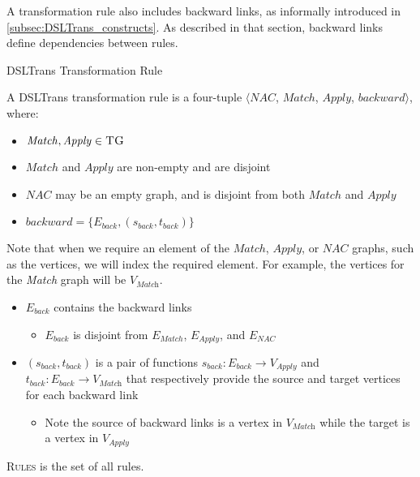 A transformation rule also includes backward links, as informally introduced in \cref{subsec:DSLTrans_constructs}. As described in that section, backward links define dependencies between rules. 


\begin{definition}{DSLTrans Transformation Rule\\}
\label{def:transformation_rule}

A DSLTrans transformation rule is a four-tuple $\big\langle \mathit{NAC}$, $\mathit{Match}$, $\mathit{Apply}$, $\mathit{backward}\big\rangle$, where:

\begin{itemize}
\item $\mathit{Match}, \mathit{Apply} \in \textsc{TG}$
\item $\mathit{Match}$ and $\mathit{Apply} $ are non-empty and are disjoint
\item $\mathit{NAC}$ may be an empty graph, and is disjoint from both $\mathit{Match}$ and $\mathit{Apply} $
\item $\mathit{backward} = \{E_{back}, (s_{back}, t_{back})\}$
\end{itemize}  

Note that when we require an element of the $\mathit{Match}$, $\mathit{Apply}$, or $\mathit{NAC}$ graphs, such as the vertices, we will index the required element. For example, the vertices for the \textit{Match} graph will be $V_{\textit{Match}}$.

\begin{itemize}
\item $E_{back}$ contains the backward links
\begin{itemize}
\item $E_{back} $ is disjoint from $E_{Match}$,  $E_{Apply}$, and $E_{NAC}$
\end{itemize}
\item $(s_{back}, t_{back})$ is a pair of functions $s_{back}: E_{back}\rightarrow V_{\textit{Apply}}$ and $t_{back}: E_{back}\rightarrow V_{\textit{Match}}$ that respectively provide the source and target vertices for each backward link
\begin{itemize}
\item Note the source of backward links is a vertex in $V_{\textit{Match}}$ while the target is a vertex in $V_{\textit{Apply}}$
\end{itemize}
\end{itemize}

\textsc{Rules} is the set of all rules.

\end{definition}

